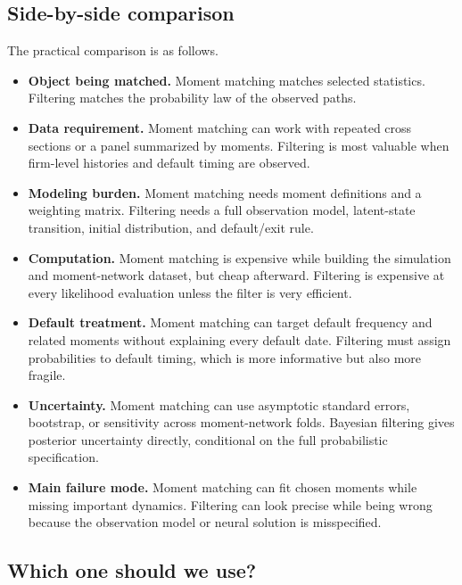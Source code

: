 \documentclass[11pt]{article}
\newcommand{\1}{\mathbf{1}}
\begin{document}
\subsection{Side-by-side comparison}

The practical comparison is as follows.

\begin{itemize}[leftmargin=2em]
  \item \textbf{Object being matched.} Moment matching matches selected
  statistics. Filtering matches the probability law of the observed paths.

  \item \textbf{Data requirement.} Moment matching can work with repeated
  cross sections or a panel summarized by moments. Filtering is most valuable
  when firm-level histories and default timing are observed.

  \item \textbf{Modeling burden.} Moment matching needs moment definitions and
  a weighting matrix. Filtering needs a full observation model, latent-state
  transition, initial distribution, and default/exit rule.

  \item \textbf{Computation.} Moment matching is expensive while building the
  simulation and moment-network dataset, but cheap afterward. Filtering is
  expensive at every likelihood evaluation unless the filter is very efficient.

  \item \textbf{Default treatment.} Moment matching can target default
  frequency and related moments without explaining every default date.
  Filtering must assign probabilities to default timing, which is more
  informative but also more fragile.

  \item \textbf{Uncertainty.} Moment matching can use asymptotic standard
  errors, bootstrap, or sensitivity across moment-network folds. Bayesian
  filtering gives posterior uncertainty directly, conditional on the full
  probabilistic specification.

  \item \textbf{Main failure mode.} Moment matching can fit chosen moments while
  missing important dynamics. Filtering can look precise while being wrong
  because the observation model or neural solution is misspecified.
\end{itemize}

\subsection{Which one should we use?}
\end{document}
